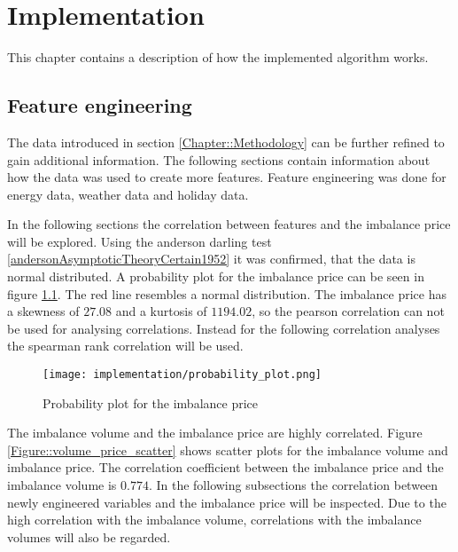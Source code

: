 \documentclass[class=scrbook, crop=false]{standalone}
\begin{document}
\chapter{Implementation} %
\label{Chapter::Implementation}
    This chapter contains a description of how the implemented algorithm works.

\section{Feature engineering}
\label{Section::Feature_engineering}

The data introduced in section \ref{Chapter::Methodology} can be further refined to gain additional information. 
The following sections contain information about how the data was used to create more features.
Feature engineering was done for energy data, weather data and holiday data.

In the following sections the correlation between features and the imbalance price will be explored.
Using the anderson darling test \ref{andersonAsymptoticTheoryCertain1952} it was confirmed, that the data is normal distributed.
A probability plot for the imbalance price can be seen in figure \ref{fig::rebap_distribution}. 
The red line resembles a normal distribution. 
The imbalance price has a skewness of $27.08$ and a kurtosis of $1194.02$, so the pearson correlation can not be used for analysing correlations.
Instead for the following correlation analyses the spearman rank correlation will be used.

\begin{figure}[ht]
            \centering
            \texttt{[image: implementation/probability\_plot.png]}
            \caption[Probability plot for the imbalance price]{Probability plot for the imbalance price}
            \label{fig::rebap_distribution}
 \end{figure}


The imbalance volume and the imbalance price are highly correlated. 
Figure \ref{Figure::volume_price_scatter} shows scatter plots for the imbalance volume and imbalance price.
The correlation coefficient between the imbalance price and the imbalance volume is $0.774$.
In the following subsections the correlation between newly engineered variables and the imbalance price will be inspected.
Due to the high correlation with the imbalance volume, correlations with the imbalance volumes will also be regarded.
\end{document}
